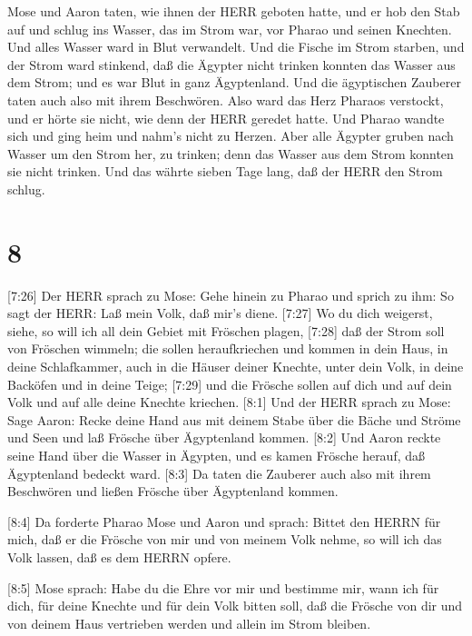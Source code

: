  Mose und Aaron taten, wie ihnen der HERR geboten hatte,
und er hob den Stab auf und schlug ins Wasser, das im Strom war, vor
Pharao und seinen Knechten. Und alles Wasser ward in Blut verwandelt.
 Und die Fische im Strom starben, und der Strom ward
stinkend, daß die Ägypter nicht trinken konnten das Wasser aus dem
Strom; und es war Blut in ganz Ägyptenland.  Und die
ägyptischen Zauberer taten auch also mit ihrem Beschwören. Also ward das
Herz Pharaos verstockt, und er hörte sie nicht, wie denn der HERR
geredet hatte.  Und Pharao wandte sich und ging heim und
nahm's nicht zu Herzen.  Aber alle Ägypter gruben nach
Wasser um den Strom her, zu trinken; denn das Wasser aus dem Strom
konnten sie nicht trinken.  Und das währte sieben Tage
lang, daß der HERR den Strom schlug.

\hypertarget{section-7}{%
\section{8}\label{section-7}}

 {[}7:26{]} Der HERR sprach zu Mose: Gehe hinein zu Pharao
und sprich zu ihm: So sagt der HERR: Laß mein Volk, daß mir's diene.
 {[}7:27{]} Wo du dich weigerst, siehe, so will ich all dein
Gebiet mit Fröschen plagen,  {[}7:28{]} daß der Strom soll
von Fröschen wimmeln; die sollen heraufkriechen und kommen in dein Haus,
in deine Schlafkammer, auch in die Häuser deiner Knechte, unter dein
Volk, in deine Backöfen und in deine Teige;  {[}7:29{]} und
die Frösche sollen auf dich und auf dein Volk und auf alle deine Knechte
kriechen.  {[}8:1{]} Und der HERR sprach zu Mose: Sage
Aaron: Recke deine Hand aus mit deinem Stabe über die Bäche und Ströme
und Seen und laß Frösche über Ägyptenland kommen.  {[}8:2{]}
Und Aaron reckte seine Hand über die Wasser in Ägypten, und es kamen
Frösche herauf, daß Ägyptenland bedeckt ward.  {[}8:3{]} Da
taten die Zauberer auch also mit ihrem Beschwören und ließen Frösche
über Ägyptenland kommen.

 {[}8:4{]} Da forderte Pharao Mose und Aaron und sprach:
Bittet den HERRN für mich, daß er die Frösche von mir und von meinem
Volk nehme, so will ich das Volk lassen, daß es dem HERRN opfere.

 {[}8:5{]} Mose sprach: Habe du die Ehre vor mir und
bestimme mir, wann ich für dich, für deine Knechte und für dein Volk
bitten soll, daß die Frösche von dir und von deinem Haus vertrieben
werden und allein im Strom bleiben.

